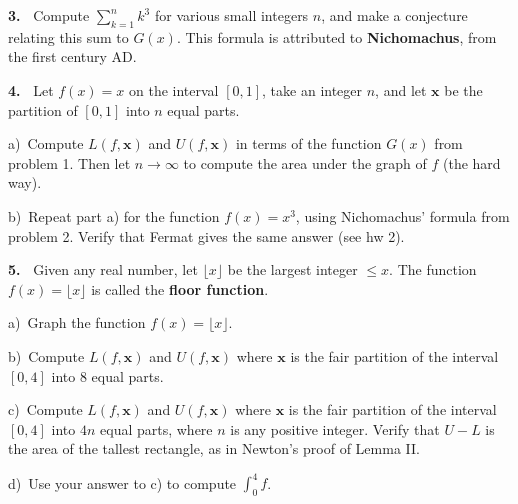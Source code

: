 \documentclass[12pt]{article}
\theoremstyle{definition}
\theoremstyle{remark}
\theoremstyle{definition}
\newcommand{\bx}{\mathbf x}
\begin{document}
\vskip10pt 
{\bf 3.\ } Compute $\sum\limits_{k=1}^n k^3$ for various small integers $n$, and make a conjecture relating this sum to $G(x)$. This formula is attributed to  {\bf Nichomachus}, from the first century AD. 

\vskip10pt 

{\bf 4.\ } Let $f(x)=x$ on the interval $[0,1]$, take an integer $n$, and let  $\bx$ be the partition of $[0,1]$ into $n$ equal parts.  

a)\ Compute $L(f,\bx)$ and $U(f,\bx)$ in terms of the function $G(x)$ from problem 1. Then let $n\to \infty$ to compute the area under the graph of $f$ (the hard way).  

b)\ Repeat part a) for the function $f(x)=x^3$, using Nichomachus' formula from problem 2.  Verify that Fermat gives the same answer (see hw 2). 



\vskip10pt 
{\bf 5.\ } Given any real number, let $\lfloor x \rfloor$ be the largest integer $\leq x$. The function $f(x)=\lfloor x \rfloor$ is called the {\bf floor function}. 

a)\ Graph the  function $f(x)=\lfloor x\rfloor$. 

b)\ Compute $L(f,\bx)$ and $U(f,\bx)$ where  $\bx$ is the fair partition of the interval $[0,4]$ into $8$ equal parts. 

c)\ Compute $L(f,\bx)$ and $U(f,\bx)$ where  $\bx$ is the fair partition of the interval $[0,4]$ into $4n$ equal parts, where $n$ is any positive integer. Verify that $U-L$ is the area of the tallest rectangle, as in Newton's proof of Lemma II. 

d)\ Use your answer to c) to compute $\int_0^4 f$. 
\end{document}
